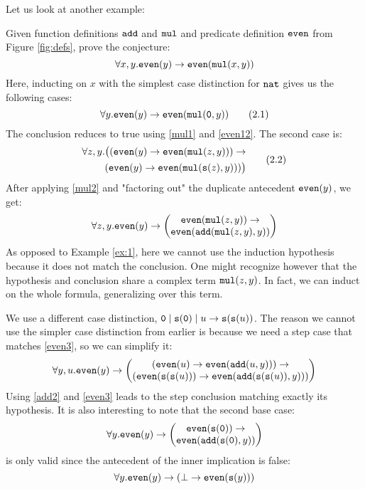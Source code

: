 Let us look at another example:
\begin{example}\label{ex:2}
	Given function definitions $\mathtt{add}$ and $\mathtt{mul}$ and predicate definition $\mathtt{even}$ from Figure \ref{fig:defs}, prove the conjecture:
	$$\forall x,y. \mathtt{even}(y)\rightarrow \mathtt{even}(\mathtt{mul}(x,y))$$
	Here, inducting on $x$ with the simplest case distinction for $\mathtt{nat}$ gives us the following cases:
	\begin{equation}\forall y. \mathtt{even}(y)\rightarrow \mathtt{even}(\mathtt{mul}(\mathtt{0},y))\tag{2.1}\end{equation}
	The conclusion reduces to true using \eqref{mul1} and \eqref{even12}. The second case is:
	\begin{align}\begin{split}\forall z,y. \big((\mathtt{even}(y)\rightarrow \mathtt{even}(\mathtt{mul}(z,y)))\rightarrow\\
	(\mathtt{even}(y)\rightarrow \mathtt{even}(\mathtt{mul}(\mathtt{s}(z),y)))\big)\end{split}\tag{2.2}\end{align}
	After applying \eqref{mul2} and "factoring out" the duplicate antecedent $\mathtt{even}(y)$, we get:
	$$\forall z,y. \mathtt{even}(y)\rightarrow\begin{pmatrix}\mathtt{even}(\mathtt{mul}(z,y))\rightarrow\\
	\mathtt{even}(\mathtt{add}(\mathtt{mul}(z,y),y))\end{pmatrix}$$
	As opposed to Example \ref{ex:1}, here we cannot use the induction hypothesis because it does not match the conclusion. One might recognize however that the hypothesis and conclusion share a complex term $\mathtt{mul}(z,y)$. In fact, we can induct on the whole formula, generalizing over this term.

	We use a different case distinction, $\mathtt{0}\mid\mathtt{s}(\mathtt{0})\mid u\rightarrow\mathtt{s}(\mathtt{s}(u))$. The reason we cannot use the simpler case distinction from earlier is because we need a step case that matches \eqref{even3}, so we can simplify it:
    $$\forall y,u. \mathtt{even}(y)\rightarrow\begin{pmatrix}(\mathtt{even}(u)\rightarrow\mathtt{even}(\mathtt{add}(u,y)))\rightarrow\\
    (\mathtt{even}(\mathtt{s}(\mathtt{s}(u)))\rightarrow\mathtt{even}(\mathtt{add}(\mathtt{s}(\mathtt{s}(u)),y)))\end{pmatrix}$$
    Using \eqref{add2} and \eqref{even3} leads to the step conclusion matching exactly its hypothesis. It is also interesting to note that the second base case:
	$$\forall y. \mathtt{even}(y)\rightarrow\begin{pmatrix}\mathtt{even}(\mathtt{s}(\mathtt{0}))\rightarrow\\
	\mathtt{even}(\mathtt{add}(\mathtt{s}(\mathtt{0}),y))\end{pmatrix}$$
	is only valid since the antecedent of the inner implication is false:
	$$\forall y. \mathtt{even}(y)\rightarrow(\bot\rightarrow\mathtt{even}(\mathtt{s}(y)))$$
\end{example}

